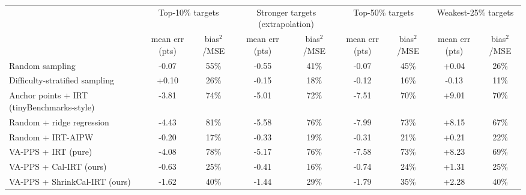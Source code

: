\begin{tabular}{lcccccccc}
\toprule
 & \multicolumn{2}{c}{Top-10\% targets} & \multicolumn{2}{c}{Stronger targets (extrapolation)} & \multicolumn{2}{c}{Top-50\% targets} & \multicolumn{2}{c}{Weakest-25\% targets} \\
 & mean err (pts) & bias$^2$/MSE & mean err (pts) & bias$^2$/MSE & mean err (pts) & bias$^2$/MSE & mean err (pts) & bias$^2$/MSE \\
\midrule
Random sampling & -0.07 & 55\% & -0.55 & 41\% & -0.07 & 45\% & +0.04 & 26\% \\
Difficulty-stratified sampling & +0.10 & 26\% & -0.15 & 18\% & -0.12 & 16\% & -0.13 & 11\% \\
Anchor points + IRT (tinyBenchmarks-style) & -3.81 & 74\% & -5.01 & 72\% & -7.51 & 70\% & +9.01 & 70\% \\
Random + ridge regression & -4.43 & 81\% & -5.58 & 76\% & -7.99 & 73\% & +8.15 & 67\% \\
Random + IRT-AIPW & -0.20 & 17\% & -0.33 & 19\% & -0.31 & 21\% & +0.21 & 22\% \\
VA-PPS + IRT (pure) & -4.08 & 78\% & -5.17 & 76\% & -7.58 & 73\% & +8.23 & 69\% \\
VA-PPS + Cal-IRT (ours) & -0.63 & 25\% & -0.41 & 16\% & -0.74 & 24\% & +1.31 & 25\% \\
VA-PPS + ShrinkCal-IRT (ours) & -1.62 & 40\% & -1.44 & 29\% & -1.79 & 35\% & +2.28 & 40\% \\
\bottomrule
\end{tabular}

